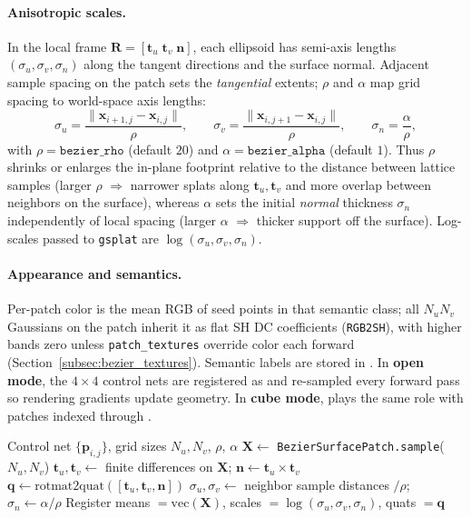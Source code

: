 \paragraph{Anisotropic scales.}
In the local frame $\mathbf{R}=[\mathbf{t}_u\;\mathbf{t}_v\;\mathbf{n}]$, each ellipsoid has semi-axis lengths $(\sigma_u,\sigma_v,\sigma_n)$ along the tangent directions and the surface normal. Adjacent sample spacing on the patch sets the \emph{tangential} extents; $\rho$ and $\alpha$ map grid spacing to world-space axis lengths:
\[
\sigma_u = \frac{\|\mathbf{x}_{i+1,j}-\mathbf{x}_{i,j}\|}{\rho},\qquad
\sigma_v = \frac{\|\mathbf{x}_{i,j+1}-\mathbf{x}_{i,j}\|}{\rho},
\qquad
\sigma_n = \frac{\alpha}{\rho},
\]
with $\rho=\texttt{bezier\_rho}$ (default $20$) and $\alpha=\texttt{bezier\_alpha}$ (default $1$). Thus $\rho$ shrinks or enlarges the in-plane footprint relative to the distance between lattice samples (larger $\rho$ $\Rightarrow$ narrower splats along $\mathbf{t}_u,\mathbf{t}_v$ and more overlap between neighbors on the surface), whereas $\alpha$ sets the initial \emph{normal} thickness $\sigma_n$ independently of local spacing (larger $\alpha$ $\Rightarrow$ thicker support off the surface). Log-scales passed to \texttt{gsplat} are $\log(\sigma_u,\sigma_v,\sigma_n)$.

\paragraph{Appearance and semantics.}
Per-patch color is the mean RGB of seed points in that semantic class; all $N_u N_v$ Gaussians on the patch inherit it as flat SH DC coefficients (\texttt{RGB2SH}), with higher bands zero unless \texttt{patch\_textures} override color each forward (Section~\ref{subsec:bezier_textures}). Semantic labels are stored in . In \textbf{open mode}, the $4\times 4$ control nets are registered as  and re-sampled every forward pass so rendering gradients update geometry. In \textbf{cube mode},  plays the same role with patches indexed through .

\begin{algorithm}[htbp]
\caption{From B\'ezier patch samples to initial Gaussian parameters (open mode)}
\label{alg:bezier_gaussian_seed}
\begin{algorithmic}[1]
\Require Control net $\{\mathbf{p}_{i,j}\}$, grid sizes $N_u,N_v$, $\rho$, $\alpha$
\State $\mathbf{X} \gets$ \texttt{BezierSurfacePatch.sample}($N_u,N_v$) 
\State $\mathbf{t}_u,\mathbf{t}_v \gets$ finite differences on $\mathbf{X}$; $\mathbf{n} \gets \mathbf{t}_u \times \mathbf{t}_v$
\State $\mathbf{q} \gets \mathrm{rotmat2quat}([\mathbf{t}_u,\mathbf{t}_v,\mathbf{n}])$
\State $\sigma_u,\sigma_v \gets$ neighbor sample distances $/\rho$; $\sigma_n \gets \alpha/\rho$
\State Register means $=\mathrm{vec}(\mathbf{X})$, scales $=\log(\sigma_u,\sigma_v,\sigma_n)$, quats $=\mathbf{q}$
\end{algorithmic}
\end{algorithm}

